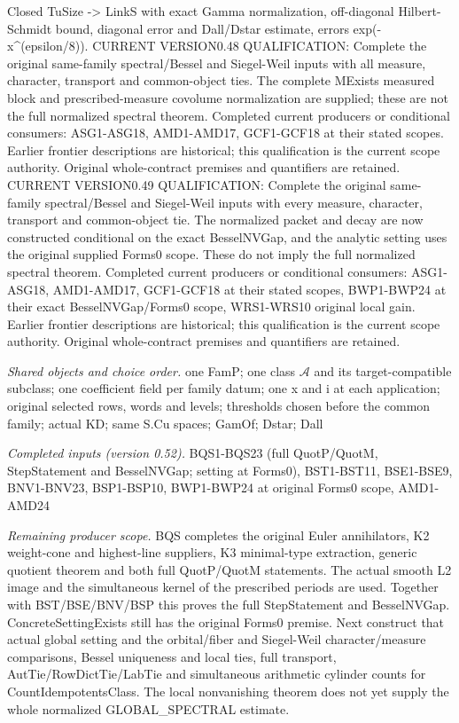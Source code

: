 Closed TuSize -> LinkS with exact Gamma normalization, off-diagonal Hilbert-Schmidt bound, diagonal error and Dall/Dstar estimate, errors exp(-x\textasciicircum{}(epsilon/8)). CURRENT VERSION0.48 QUALIFICATION: Complete the original same-family spectral/Bessel and Siegel-Weil inputs with all measure, character, transport and common-object ties. The complete MExists measured block and prescribed-measure covolume normalization are supplied; these are not the full normalized spectral theorem. Completed current producers or conditional consumers: ASG1-ASG18, AMD1-AMD17, GCF1-GCF18 at their stated scopes. Earlier frontier descriptions are historical; this qualification is the current scope authority. Original whole-contract premises and quantifiers are retained. CURRENT VERSION0.49 QUALIFICATION: Complete the original same-family spectral/Bessel and Siegel-Weil inputs with every measure, character, transport and common-object tie. The normalized packet and decay are now constructed conditional on the exact BesselNVGap, and the analytic setting uses the original supplied Forms0 scope. These do not imply the full normalized spectral theorem. Completed current producers or conditional consumers: ASG1-ASG18, AMD1-AMD17, GCF1-GCF18 at their stated scopes, BWP1-BWP24 at their exact BesselNVGap/Forms0 scope, WRS1-WRS10 original local gain. Earlier frontier descriptions are historical; this qualification is the current scope authority. Original whole-contract premises and quantifiers are retained.

\emph{Shared objects and choice order.} one FamP; one class $\mathcal A$ and its target-compatible subclass; one coefficient field per family datum; one x and i at each application; original selected rows, words and levels; thresholds chosen before the common family; actual KD; same S.Cu spaces; GamOf; Dstar; Dall

\emph{Completed inputs (version 0.52).} BQS1-BQS23 (full QuotP/QuotM, StepStatement and BesselNVGap; setting at Forms0), BST1-BST11, BSE1-BSE9, BNV1-BNV23, BSP1-BSP10, BWP1-BWP24 at original Forms0 scope, AMD1-AMD24

\emph{Remaining producer scope.} BQS completes the original Euler annihilators, K2 weight-cone and highest-line suppliers, K3 minimal-type extraction, generic quotient theorem and both full QuotP/QuotM statements. The actual smooth L2 image and the simultaneous kernel of the prescribed periods are used. Together with BST/BSE/BNV/BSP this proves the full StepStatement and BesselNVGap. ConcreteSettingExists still has the original Forms0 premise. Next construct that actual global setting and the orbital/fiber and Siegel-Weil character/measure comparisons, Bessel uniqueness and local ties, full transport, AutTie/RowDictTie/LabTie and simultaneous arithmetic cylinder counts for CountIdempotentsClass. The local nonvanishing theorem does not yet supply the whole normalized GLOBAL\_\allowbreak SPECTRAL estimate.

